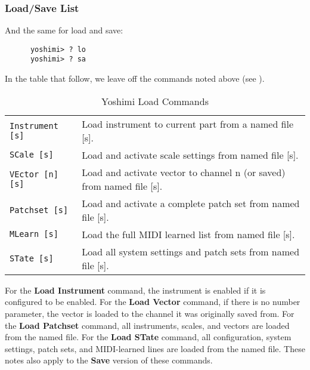 \subsubsection{Load/Save List}
\label{subsec:command_line_loadsave_list}

   And the same for load and save:

   \begin{verbatim}
      yoshimi> ? lo
      yoshimi> ? sa
   \end{verbatim}

   In the table that follow, we leave off the commands noted above
   (see ).

   \begin{table}[H]
      \centering
      \caption{Yoshimi Load Commands}
      \label{table:yoshimi_text_load_commands}
      \begin{tabular}{l l}

\texttt{Instrument [s]} &
   Load instrument to current part from a named file [s]. \\
\texttt{SCale [s]} &
   Load and activate scale settings from named file [s]. \\
\texttt{VEctor [n] [s]} &
   Load and activate vector to channel n (or saved) from named file [s]. \\
\texttt{Patchset [s]} &
   Load and activate a complete patch set from named file [s]. \\
\texttt{MLearn [s]} &
   Load the full MIDI learned list from named file [s]. \\
\texttt{STate [s]} &
   Load all system settings and patch sets from named file [s]. \\

      \end{tabular}
   \end{table}

   For the \textbf{Load Instrument} command, the instrument is enabled if it is
   configured to be enabled.  For the \textbf{Load Vector} command, if there is
   no number parameter, the vector is loaded to the channel it was originally
   saved from.
   For the \textbf{Load Patchset} command, all instruments, scales, and vectors
   are loaded from the named file.
   For the \textbf{Load STate} command, all configuration, system settings,
   patch sets, and MIDI-learned lines are loaded from the named file.
   These notes also apply to the \textbf{Save} version of these commands.

